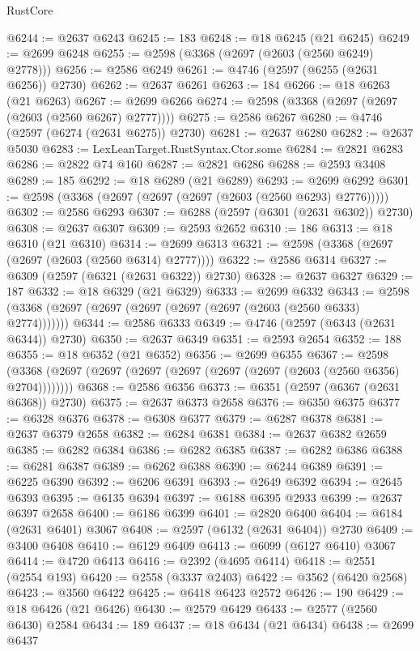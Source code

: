 \begin{lexlean}{RustCore}
\begin{coremodule}
@6244 := @2637 @6243
@6245 := 183
@6248 := @18 @6245 (@21 @6245)
@6249 := @2699 @6248
@6255 := @2598 (@3368 (@2697 (@2603 (@2560 @6249) @2778)))
@6256 := @2586 @6249
@6261 := @4746 (@2597 (@6255 (@2631 @6256)) @2730)
@6262 := @2637 @6261
@6263 := 184
@6266 := @18 @6263 (@21 @6263)
@6267 := @2699 @6266
@6274 := @2598 (@3368 (@2697 (@2697 (@2603 (@2560 @6267) @2777))))
@6275 := @2586 @6267
@6280 := @4746 (@2597 (@6274 (@2631 @6275)) @2730)
@6281 := @2637 @6280
@6282 := @2637 @5030
@6283 := LexLeanTarget.RustSyntax.Ctor.some
@6284 := @2821 @6283
@6286 := @2822 @74 @160
@6287 := @2821 @6286
@6288 := @2593 @3408
@6289 := 185
@6292 := @18 @6289 (@21 @6289)
@6293 := @2699 @6292
@6301 := @2598 (@3368 (@2697 (@2697 (@2697 (@2603 (@2560 @6293) @2776)))))
@6302 := @2586 @6293
@6307 := @6288 (@2597 (@6301 (@2631 @6302)) @2730)
@6308 := @2637 @6307
@6309 := @2593 @2652
@6310 := 186
@6313 := @18 @6310 (@21 @6310)
@6314 := @2699 @6313
@6321 := @2598 (@3368 (@2697 (@2697 (@2603 (@2560 @6314) @2777))))
@6322 := @2586 @6314
@6327 := @6309 (@2597 (@6321 (@2631 @6322)) @2730)
@6328 := @2637 @6327
@6329 := 187
@6332 := @18 @6329 (@21 @6329)
@6333 := @2699 @6332
@6343 := @2598 (@3368 (@2697 (@2697 (@2697 (@2697 (@2697 (@2603 (@2560 @6333) @2774)))))))
@6344 := @2586 @6333
@6349 := @4746 (@2597 (@6343 (@2631 @6344)) @2730)
@6350 := @2637 @6349
@6351 := @2593 @2654
@6352 := 188
@6355 := @18 @6352 (@21 @6352)
@6356 := @2699 @6355
@6367 := @2598 (@3368 (@2697 (@2697 (@2697 (@2697 (@2697 (@2697 (@2603 (@2560 @6356) @2704))))))))
@6368 := @2586 @6356
@6373 := @6351 (@2597 (@6367 (@2631 @6368)) @2730)
@6375 := @2637 @6373 @2658
@6376 := @6350 @6375
@6377 := @6328 @6376
@6378 := @6308 @6377
@6379 := @6287 @6378
@6381 := @2637 @6379 @2658
@6382 := @6284 @6381
@6384 := @2637 @6382 @2659
@6385 := @6282 @6384
@6386 := @6282 @6385
@6387 := @6282 @6386
@6388 := @6281 @6387
@6389 := @6262 @6388
@6390 := @6244 @6389
@6391 := @6225 @6390
@6392 := @6206 @6391
@6393 := @2649 @6392
@6394 := @2645 @6393
@6395 := @6135 @6394
@6397 := @6188 @6395 @2933
@6399 := @2637 @6397 @2658
@6400 := @6186 @6399
@6401 := @2820 @6400
@6404 := @6184 (@2631 @6401) @3067
@6408 := @2597 (@6132 (@2631 @6404)) @2730
@6409 := @3400 @6408
@6410 := @6129 @6409
@6413 := @6099 (@6127 @6410) @3067
@6414 := @4720 @6413
@6416 := @2392 (@4695 @6414)
@6418 := @2551 (@2554 @193)
@6420 := @2558 (@3337 @2403)
@6422 := @3562 (@6420 @2568)
@6423 := @3560 @6422
@6425 := @6418 @6423 @2572
@6426 := 190
@6429 := @18 @6426 (@21 @6426)
@6430 := @2579 @6429
@6433 := @2577 (@2560 @6430) @2584
@6434 := 189
@6437 := @18 @6434 (@21 @6434)
@6438 := @2699 @6437

\end{coremodule}
\end{lexlean}
